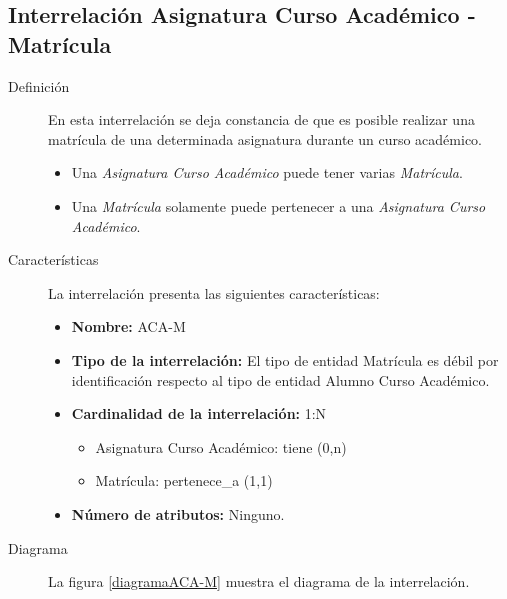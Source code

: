 \subsection{Interrelación Asignatura Curso Académico - Matrícula}

   \begin{description}
      \item[Definición] En esta interrelación se deja constancia de que es
      posible realizar una matrícula de una determinada asignatura durante un
      curso académico.

      \begin{itemize}
       \item Una \textit{Asignatura Curso Académico} puede tener varias
             \textit{Matrícula}.
       \item Una \textit{Matrícula} solamente puede
             pertenecer a una \textit{Asignatura Curso Académico}.
      \end{itemize}

      \item[Características] La interrelación presenta las siguientes
                             características:

         \begin{itemize}
            \item \textbf{Nombre:} ACA-M
            \item \textbf{Tipo de la interrelación:} El tipo de entidad
                  Matrícula es débil por identificación
                  respecto al tipo de entidad Alumno Curso Académico.
            \item \textbf{Cardinalidad de la interrelación:} 1:N
                  \begin{itemize}
                     \item Asignatura Curso Académico: tiene (0,n)
                     \item Matrícula: pertenece\_a (1,1)
                  \end{itemize}
            \item \textbf{Número de atributos:} Ninguno.
         \end{itemize}

      \item[Diagrama] La figura \ref{diagramaACA-M} muestra el diagrama de la
                      interrelación.


\end{description}
